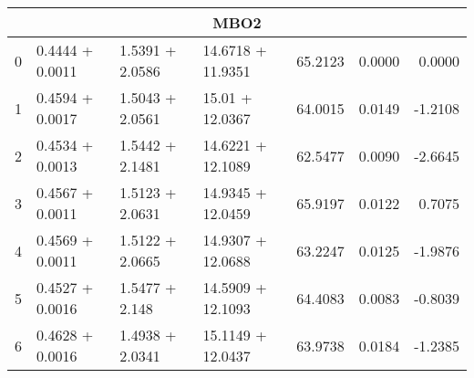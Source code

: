 \begin{tabular}{llllrrr}
  \midrule
  \multicolumn{7}{c}{MBO2} \\
  \midrule
  0 &  0.4444 + 0.0011 &  1.5391 + 2.0586 &  14.6718 + 11.9351 &             65.2123 &                 0.0000 &         0.0000 \\
  1 &  0.4594 + 0.0017 &  1.5043 + 2.0561 &    15.01 + 12.0367 &             64.0015 &                 0.0149 &        -1.2108 \\
  2 &  0.4534 + 0.0013 &  1.5442 + 2.1481 &  14.6221 + 12.1089 &             62.5477 &                 0.0090 &        -2.6645 \\
  3 &  0.4567 + 0.0011 &  1.5123 + 2.0631 &  14.9345 + 12.0459 &             65.9197 &                 0.0122 &         0.7075 \\
  4 &  0.4569 + 0.0011 &  1.5122 + 2.0665 &  14.9307 + 12.0688 &             63.2247 &                 0.0125 &        -1.9876 \\
  5 &  0.4527 + 0.0016 &   1.5477 + 2.148 &  14.5909 + 12.1093 &             64.4083 &                 0.0083 &        -0.8039 \\
  6 &  0.4628 + 0.0016 &  1.4938 + 2.0341 &  15.1149 + 12.0437 &             63.9738 &                 0.0184 &        -1.2385 \\
  \bottomrule
  \end{tabular}
  